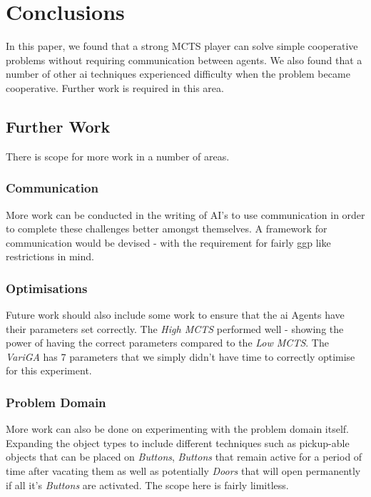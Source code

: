 \documentclass{IEEEtran}
\begin{document}
\section{Conclusions}
In this paper, we found that a strong MCTS player can solve simple cooperative problems without requiring communication between agents. We also found that a number of other \gls{ai} techniques experienced difficulty when the problem became cooperative. Further work is required in this area.

\subsection{Further Work}
There is scope for more work in a number of areas.

\subsubsection{Communication}
More work can be conducted in the writing of AI's to use communication in order to complete these challenges better amongst themselves. A framework for communication would be devised - with the requirement for fairly \gls{ggp} like restrictions in mind.

\subsubsection{Optimisations}
Future work should also include some work to ensure that the \gls{ai} Agents have their parameters set correctly. The \emph{High MCTS} performed well - showing the power of having the correct parameters compared to the \emph{Low MCTS}. The \emph{VariGA} has 7 parameters that we simply didn't have time to correctly optimise for this experiment.

\subsubsection{Problem Domain}
More work can also be done on experimenting with the problem domain itself. Expanding the object types to include different techniques such as pickup-able objects that can be placed on \emph{Buttons}, \emph{Buttons} that remain active for a period of time after vacating them as well as potentially \emph{Doors} that will open permanently if all it's \emph{Buttons} are activated. The scope here is fairly limitless.



\end{document}
